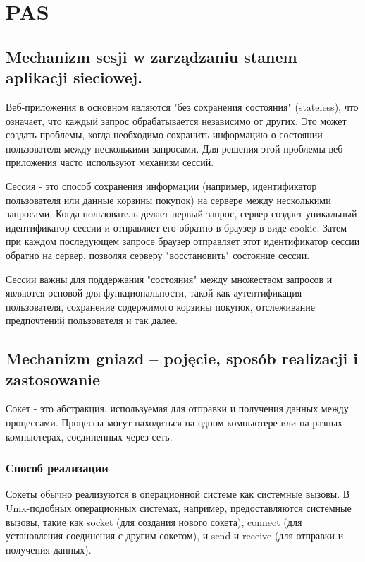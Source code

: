 \chapter{PAS}
\section{Mechanizm sesji w zarządzaniu stanem aplikacji sieciowej.}

Веб-приложения в основном являются "без сохранения состояния" (stateless), что означает, что каждый запрос обрабатывается независимо от других. Это может создать проблемы, когда необходимо сохранить информацию о состоянии пользователя между несколькими запросами. Для решения этой проблемы веб-приложения часто используют механизм сессий.

Сессия - это способ сохранения информации (например, идентификатор пользователя или данные корзины покупок) на сервере между несколькими запросами. Когда пользователь делает первый запрос, сервер создает уникальный идентификатор сессии и отправляет его обратно в браузер в виде cookie. Затем при каждом последующем запросе браузер отправляет этот идентификатор сессии обратно на сервер, позволяя серверу "восстановить" состояние сессии.

Сессии важны для поддержания "состояния" между множеством запросов и являются основой для функциональности, такой как аутентификация пользователя, сохранение содержимого корзины покупок, отслеживание предпочтений пользователя и так далее.


\section{Mechanizm gniazd – pojęcie, sposób realizacji i zastosowanie }

Сокет - это абстракция, используемая для отправки и получения данных между процессами. Процессы могут находиться на одном компьютере или на разных компьютерах, соединенных через сеть.

\subsection*{Способ реализации}

Сокеты обычно реализуются в операционной системе как системные вызовы. В Unix-подобных операционных системах, например, предоставляются системные вызовы, такие как socket (для создания нового сокета), connect (для установления соединения с другим сокетом), и send и receive (для отправки и получения данных).

